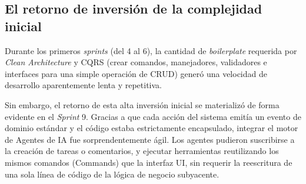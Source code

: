 \subsection{El retorno de inversión de la complejidad inicial}
Durante los primeros \emph{sprints} (del 4 al 6), la cantidad de \emph{boilerplate} requerida por \emph{Clean Architecture} y \ac{CQRS} (crear comandos, manejadores, validadores e interfaces para una simple operación de \ac{CRUD}) generó una velocidad de desarrollo aparentemente lenta y repetitiva.

Sin embargo, el retorno de esta alta inversión inicial se materializó de forma evidente en el \emph{Sprint} 9. Gracias a que cada acción del sistema emitía un evento de dominio estándar y el código estaba estrictamente encapsulado, integrar el motor de Agentes de \ac{IA} fue sorprendentemente ágil. Los agentes pudieron suscribirse a la creación de tareas o comentarios, y ejecutar herramientas reutilizando los mismos comandos (Commands) que la interfaz \ac{UI}, sin requerir la reescritura de una sola línea de código de la lógica de negocio subyacente.
